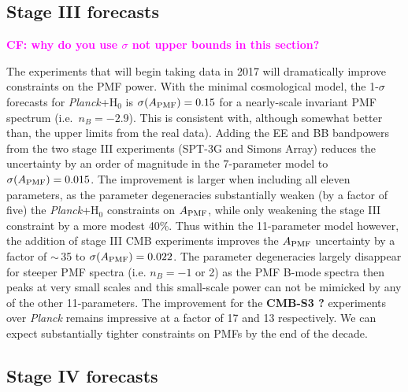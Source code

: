 \documentclass[apj]{emulateapj}
\newcommand{\apmf}{\ensuremath{A_{\rm PMF}}}
\newcommand{\lcdm}{\ensuremath{\Lambda}CDM}
\newcommand{\ho}{H\ensuremath{_0}}
\newcommand{\planck}{{\sl Planck}}
\newcommand{\sptnew}{SPT-3G}
\newcommand{\simons}{Simons Array}
\newcommand{\tbd}[1]{\textcolor{Red}{{\bf TBD}: #1}}
\begin{document}

\subsection{Stage III forecasts}\textbf{\textcolor{magenta}{CF: why do you use $\sigma$ not upper bounds in this section?}}

The experiments that will begin taking data in 2017 will dramatically improve constraints on the PMF power. 
With the minimal cosmological model, the 1-$\sigma$ forecasts for \planck{}+\ho{} is $\sigma(\apmf)=\fisherAplk$ for a nearly-scale invariant PMF spectrum (i.e.~$n_B=-2.9$). 
This is consistent with, although somewhat better than, the upper limits from the real data).  
Adding the EE and BB bandpowers from the two stage III experiments (\sptnew{} and \simons{}) reduces the uncertainty by an order of magnitude in the 7-parameter model to $\sigma(\apmf)=0.015$. 
The improvement is larger when including all eleven parameters, as the parameter degeneracies substantially weaken (by a factor of five) the \planck+\ho{} constraints on \apmf{}, while only weakening the stage III constraint by a  more modest 40\%. 
Thus within the 11-parameter model however,  the addition of stage III CMB experiments improves the \apmf{} uncertainty by a factor of $\sim$\,35 to  $\sigma(\apmf)=0.022$. 
The parameter degeneracies largely disappear for steeper PMF spectra (i.e. $n_B=-1$ or 2) as the PMF B-mode spectra then peaks at very small scales and this small-scale power can not be mimicked by any of the other 11-parameters. 
The improvement for the \textbf{CMB-S3 ?} experiments over \planck{} remains impressive at a factor of 17 and 13 respectively. 
We can expect substantially tighter constraints on PMFs by the end of the decade. 

\subsection{Stage IV forecasts}
\end{document}
